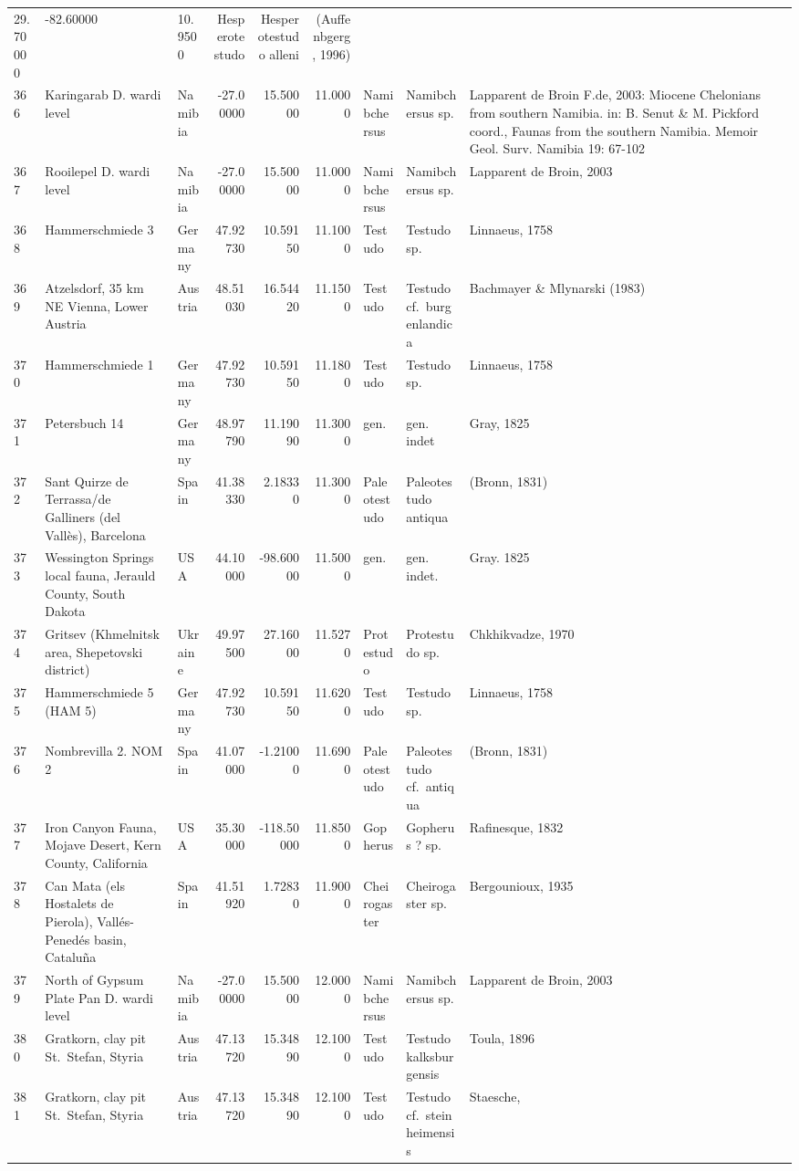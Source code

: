\documentclass[]{article}
\begin{document}
\begin{longtable}[]{@{}lllrrrlll@{}}
29.70000 & -82.60000 & 10.9500 & Hesperotestudo & Hesperotestudo alleni
& (Auffenbgerg, 1996)\tabularnewline
366 & Karingarab D. wardi level & Namibia & -27.00000 & 15.50000 &
11.0000 & Namibchersus & Namibchersus sp. & Lapparent de Broin F.de,
2003: Miocene Chelonians from southern Namibia. in: B. Senut \& M.
Pickford coord., Faunas from the southern Namibia. Memoir Geol. Surv.
Namibia 19: 67-102\tabularnewline
367 & Rooilepel D. wardi level & Namibia & -27.00000 & 15.50000 &
11.0000 & Namibchersus & Namibchersus sp. & Lapparent de Broin,
2003\tabularnewline
368 & Hammerschmiede 3 & Germany & 47.92730 & 10.59150 & 11.1000 &
Testudo & Testudo sp. & Linnaeus, 1758\tabularnewline
369 & Atzelsdorf, 35 km NE Vienna, Lower Austria & Austria & 48.51030 &
16.54420 & 11.1500 & Testudo & Testudo cf.~burgenlandica & Bachmayer \&
Mlynarski (1983)\tabularnewline
370 & Hammerschmiede 1 & Germany & 47.92730 & 10.59150 & 11.1800 &
Testudo & Testudo sp. & Linnaeus, 1758\tabularnewline
371 & Petersbuch 14 & Germany & 48.97790 & 11.19090 & 11.3000 & gen. &
gen. indet & Gray, 1825\tabularnewline
372 & Sant Quirze de Terrassa/de Galliners (del Vallès), Barcelona &
Spain & 41.38330 & 2.18330 & 11.3000 & Paleotestudo & Paleotestudo
antiqua & (Bronn, 1831)\tabularnewline
373 & Wessington Springs local fauna, Jerauld County, South Dakota & USA
& 44.10000 & -98.60000 & 11.5000 & gen. & gen. indet. & Gray.
1825\tabularnewline
374 & Gritsev (Khmelnitsk area, Shepetovski district) & Ukraine &
49.97500 & 27.16000 & 11.5270 & Protestudo & Protestudo sp. &
Chkhikvadze, 1970\tabularnewline
375 & Hammerschmiede 5 (HAM 5) & Germany & 47.92730 & 10.59150 & 11.6200
& Testudo & Testudo sp. & Linnaeus, 1758\tabularnewline
376 & Nombrevilla 2. NOM 2 & Spain & 41.07000 & -1.21000 & 11.6900 &
Paleotestudo & Paleotestudo cf.~antiqua & (Bronn, 1831)\tabularnewline
377 & Iron Canyon Fauna, Mojave Desert, Kern County, California & USA &
35.30000 & -118.50000 & 11.8500 & Gopherus & Gopherus ? sp. &
Rafinesque, 1832\tabularnewline
378 & Can Mata (els Hostalets de Pierola), Vallés-Penedés basin,
Cataluña & Spain & 41.51920 & 1.72830 & 11.9000 & Cheirogaster &
Cheirogaster sp. & Bergounioux, 1935\tabularnewline
379 & North of Gypsum Plate Pan D. wardi level & Namibia & -27.00000 &
15.50000 & 12.0000 & Namibchersus & Namibchersus sp. & Lapparent de
Broin, 2003\tabularnewline
380 & Gratkorn, clay pit St.~Stefan, Styria & Austria & 47.13720 &
15.34890 & 12.1000 & Testudo & Testudo kalksburgensis & Toula,
1896\tabularnewline
381 & Gratkorn, clay pit St.~Stefan, Styria & Austria & 47.13720 &
15.34890 & 12.1000 & Testudo & Testudo cf.~steinheimensis & Staesche,

\end{longtable}
\end{document}
